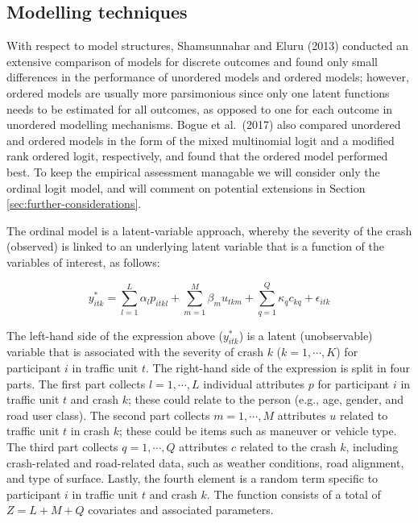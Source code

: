 \documentclass[]{elsarticle} %
\begin{document}
\hypertarget{modelling-techniques}{%
\subsection{Modelling techniques}\label{modelling-techniques}}

With respect to model structures, Shamsunnahar and Eluru (2013)
conducted an extensive comparison of models for discrete outcomes and
found only small differences in the performance of unordered models and
ordered models; however, ordered models are usually more parsimonious
since only one latent functions needs to be estimated for all outcomes,
as opposed to one for each outcome in unordered modelling mechanisms.
Bogue et al.~(2017) also compared unordered and ordered models in the
form of the mixed multinomial logit and a modified rank ordered logit,
respectively, and found that the ordered model performed best. To keep
the empirical assessment managable we will consider only the ordinal
logit model, and will comment on potential extensions in Section
\ref{sec:further-considerations}.

The ordinal model is a latent-variable approach, whereby the severity of
the crash (observed) is linked to an underlying latent variable that is
a function of the variables of interest, as follows:

\begin{equation}
\label{eq:latent-function}
y_{itk}^*=\sum_{l=1}^L\alpha_lp_{itkl} + \sum_{m=1}^M\beta_mu_{tkm} + \sum_{q=1}^Q\kappa_qc_{kq} + \epsilon_{itk}
\end{equation}

The left-hand side of the expression above (\(y_{itk}^*\)) is a latent
(unobservable) variable that is associated with the severity of crash
\(k\) (\(k=1,\cdots,K\)) for participant \(i\) in traffic unit \(t\).
The right-hand side of the expression is split in four parts. The first
part collects \(l=1,\cdots,L\) individual attributes \(p\) for
participant \(i\) in traffic unit \(t\) and crash \(k\); these could
relate to the person (e.g., age, gender, and road user class). The
second part collects \(m=1,\cdots,M\) attributes \(u\) related to
traffic unit \(t\) in crash \(k\); these could be items such as maneuver
or vehicle type. The third part collects \(q=1,\cdots,Q\) attributes
\(c\) related to the crash \(k\), including crash-related and
road-related data, such as weather conditions, road alignment, and type
of surface. Lastly, the fourth element is a random term specific to
participant \(i\) in traffic unit \(t\) and crash \(k\). The function
consists of a total of \(Z=L+M+Q\) covariates and associated parameters.
\end{document}
